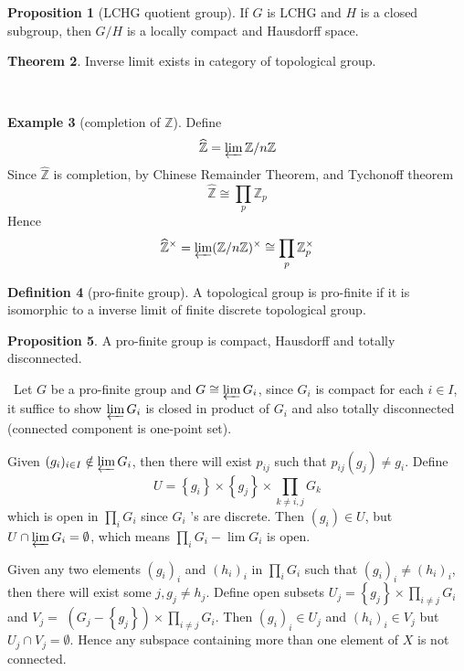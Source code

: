 \documentclass[12pt,a4paper]{book}
\newenvironment{prooff}{{\noindent\it\textcolor{cyan!40!black}{Proof}:}\,}{\par}
\newcommand{\bb}[1]{\mathbb{#1}}
\theoremstyle{definition}
\newtheorem{defn}{Definition}[section]
\newtheorem{theo}[defn]{Theorem}
\newtheorem{prop}[defn]{Proposition}
\newtheorem{exam}[defn]{Example}
\begin{document}
\begin{prop}[LCHG quotient group]
    If $G$ is LCHG and $H$ is a closed subgroup, then $G/H$ is a locally compact and Hausdorff space.
\end{prop}
\begin{theo}
    Inverse limit exists in category of topological group.
\end{theo}
\begin{prooff}

\end{prooff}
\begin{exam}[completion of $\bb{Z}$]
    Define 
    \begin{equation*}
        \widehat{\bb{Z}}=\varprojlim \bb{Z}/n\bb{Z}
    \end{equation*}
    Since $\widehat{\bb{Z}}$ is completion, by Chinese Remainder Theorem, and Tychonoff theorem
    \begin{equation*}
        \widehat{\bb{Z}}\cong \prod_p \bb{Z}_p
    \end{equation*}
    Hence 
    \begin{equation*}
        \widehat{\bb{Z}}^\times= \varprojlim (\bb{Z}/n\bb{Z})^\times \cong \prod_p \bb{Z}_p^\times
    \end{equation*}
\end{exam}
\begin{defn}[pro-finite group]
    A topological group is pro-finite if it is isomorphic to a inverse limit of finite discrete topological group.
\end{defn}
\begin{prop}
    A pro-finite group is compact, Hausdorff and totally disconnected.
\end{prop}
\begin{prooff}
    Let $G$ be a pro-finite group and $G\cong \varprojlim G_i$, since $G_i$ is compact for each $i\in I$, it suffice to show $\varprojlim G_i$ is
    closed in product of $G_i$ and also totally disconnected (connected component is one-point set).

    Given $(g_i)_{i\in I} \notin \varprojlim G_i$, then there will exist $p_{i j}$ such that $p_{i j}\left(g_j\right) \neq g_i$. Define
    $$
        U=\left\{g_i\right\} \times\left\{g_j\right\} \times \prod_{k \neq i, j} G_k
    $$
    which is open in $\prod_i G_i$ since $G_i$ 's are discrete. Then $\left(g_i\right) \in U$, but $U \cap \varprojlim G_i=\emptyset$, which means $\prod_i G_i-\lim G_i$ is open.

    Given any two elements $\left(g_i\right)_i$ and $\left(h_i\right)_i$ in $\prod_i G_i$ such that $\left(g_i\right)_i \neq\left(h_i\right)_i$, then there will exist some $j, g_j \neq h_j$. Define open subsets $U_j=\left\{g_j\right\} \times \prod_{i \neq j} G_i$ and $V_j=$ $\left(G_j-\left\{g_j\right\}\right) \times \prod_{i \neq j} G_i$. Then $\left(g_i\right)_i \in U_j$ and $\left(h_i\right)_i \in V_j$ but $U_j \cap V_j=\emptyset$. Hence any subspace containing more than one element of $X$ is not connected.
\end{prooff}
\end{document}
